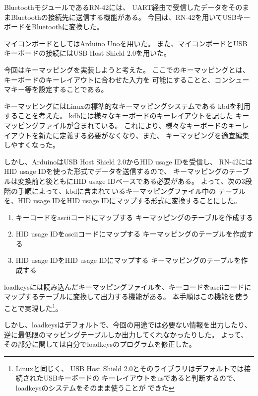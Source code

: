  \label{sc:usb2bt2}
BluetoothモジュールであるRN-42には、
UART経由で受信したデータをそのままBluetoothの接続先に送信する機能がある。
今回は、RN-42を用いてUSBキーボードをBluetoothに変換した。

マイコンボードとしてはArduino Unoを用いた。
また、マイコンボードとUSBキーボードの接続にはUSB Host Shield 2.0を用いた。

今回はキーマッピングを実装しようと考えた。
ここでのキーマッピングとは、キーボードのキーレイアウトに合わせた入力を
可能にすることと、コンシューマキー等を設定することである。

キーマッピングにはLinuxの標準的なキーマッピングシステムである
kbdを利用することを考えた。
kdbには様々なキーボードのキーレイアウトを記した
キーマッピングファイルが含まれている。
これにより、様々なキーボードのキーレイアウトを新たに定義する必要がなくなり、また、
キーマッピングを適宜編集しやすくなった。

しかし、ArduinoはUSB Host Shield 2.0からHID usage IDを受信し、
RN-42にはHID usage IDを使った形式でデータを送信するので、
キーマッピングのテーブルは変換前と後ともにHID usage IDベースである必要がある。
よって、次の3段階の手順によって、kbdに含まれているキーマッピングファイル中の
テーブルを、HID usage IDをHID usage IDにマップする形式に変換することにした。
\begin{enumerate}
 \item キーコードをasciiコードにマップする
  キーマッピングのテーブルを作成する \label{enum:usb2bt2-mapping-1}
 \item HID usage IDをasciiコードにマップする
  キーマッピングのテーブルを作成する \label{enum:usb2bt2-mapping-2}
 \item HID usage IDをHID usage IDにマップする
  キーマッピングのテーブルを作成する \label{enum:usb2bt2-mapping-3}
\end{enumerate}

loadkeysには読み込んだキーマッピングファイルを、キーコードをasciiコードに
マップするテーブルに変換して出力する機能がある。
本手順はこの機能を使うことで実現した\footnote{Linuxと同じく、
USB Host Shield 2.0とそのライブラリはデフォルトでは接続されたUSBキーボードの
キーレイアウトをusであると判断するので、loadkeysのシステムをそのまま使うことが
できた}。

しかし、loadkeysはデフォルトで、今回の用途では必要ない情報を出力したり、
逆に最低限のマッピングテーブルしか出力してくれなかったりした。
よって、その部分に関しては自分でloadkeysのプログラムを修正した。


